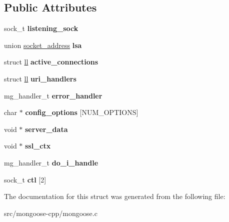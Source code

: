 \subsection*{Public Attributes}
\begin{DoxyCompactItemize}
\item 
sock\+\_\+t {\bfseries listening\+\_\+sock}\hypertarget{structmg__server_ae7920e1a4088c4133971a1012c0958c8}{}\label{structmg__server_ae7920e1a4088c4133971a1012c0958c8}

\item 
union \hyperlink{unionsocket__address}{socket\+\_\+address} {\bfseries lsa}\hypertarget{structmg__server_acbc9c742af372629b15619508931d1c5}{}\label{structmg__server_acbc9c742af372629b15619508931d1c5}

\item 
struct \hyperlink{structll}{ll} {\bfseries active\+\_\+connections}\hypertarget{structmg__server_a92332f2bc9c67d9090c1a3c20820abc8}{}\label{structmg__server_a92332f2bc9c67d9090c1a3c20820abc8}

\item 
struct \hyperlink{structll}{ll} {\bfseries uri\+\_\+handlers}\hypertarget{structmg__server_a49663691f750bfc21a2745d263e1dc89}{}\label{structmg__server_a49663691f750bfc21a2745d263e1dc89}

\item 
mg\+\_\+handler\+\_\+t {\bfseries error\+\_\+handler}\hypertarget{structmg__server_ab9b22c112ff6d42dc30039deb1d5a3e4}{}\label{structmg__server_ab9b22c112ff6d42dc30039deb1d5a3e4}

\item 
char $\ast$ {\bfseries config\+\_\+options} \mbox{[}N\+U\+M\+\_\+\+O\+P\+T\+I\+O\+NS\mbox{]}\hypertarget{structmg__server_a873aee94660c99fb7b4a8a872636f619}{}\label{structmg__server_a873aee94660c99fb7b4a8a872636f619}

\item 
void $\ast$ {\bfseries server\+\_\+data}\hypertarget{structmg__server_a1b8e400df268b9a86f17d8f23e61fa24}{}\label{structmg__server_a1b8e400df268b9a86f17d8f23e61fa24}

\item 
void $\ast$ {\bfseries ssl\+\_\+ctx}\hypertarget{structmg__server_acfcce3b8569061cf97f90947f3c92229}{}\label{structmg__server_acfcce3b8569061cf97f90947f3c92229}

\item 
mg\+\_\+handler\+\_\+t {\bfseries do\+\_\+i\+\_\+handle}\hypertarget{structmg__server_a1b1c4e0efb7d5c0e274d85191c95293c}{}\label{structmg__server_a1b1c4e0efb7d5c0e274d85191c95293c}

\item 
sock\+\_\+t {\bfseries ctl} \mbox{[}2\mbox{]}\hypertarget{structmg__server_aa1f78ce3c3bc85704806136e5918f5bc}{}\label{structmg__server_aa1f78ce3c3bc85704806136e5918f5bc}

\end{DoxyCompactItemize}


The documentation for this struct was generated from the following file\+:\begin{DoxyCompactItemize}
\item 
src/mongoose-\/cpp/mongoose.\+c\end{DoxyCompactItemize}
